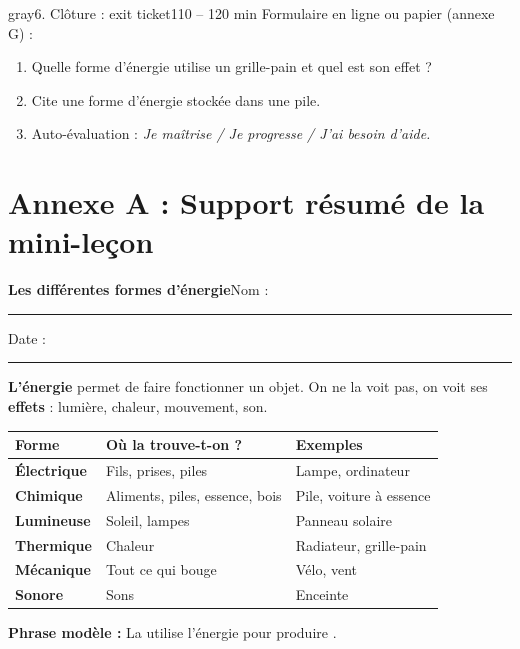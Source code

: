 \documentclass[11pt,a4paper]{article}
\newcommand{\entete}[2]{%
  \begin{tcolorbox}[colback=#1!10,colframe=#1!70!black,boxrule=0.8pt,arc=2mm]
  {\Large\bfseries #2}\hfill Nom : \rule{4cm}{0.3pt}\quad Date : \rule{2.2cm}{0.3pt}
  \end{tcolorbox}}
\begin{document}
\begin{etape}{gray}{6. Clôture : exit ticket}{110 -- 120 min}
Formulaire en ligne ou papier (annexe G) :
\begin{enumerate}
 \item Quelle forme d'énergie utilise un grille-pain et quel est son effet ?
 \item Cite une forme d'énergie stockée dans une pile.
 \item Auto-évaluation : \emph{Je maîtrise / Je progresse / J'ai besoin d'aide.}
\end{enumerate}
\end{etape}

\newpage
\section*{Annexe A : Support résumé de la mini-leçon}
\entete{blue}{Les différentes formes d'énergie}

\begin{tcolorbox}[colback=yellow!10,colframe=yellow!50!black]
\textbf{L'énergie} permet de faire fonctionner un objet. On ne la voit pas, on voit ses \textbf{effets} : lumière, chaleur, mouvement, son.
\end{tcolorbox}

\begin{tabularx}{\linewidth}{>{\bfseries}p{2.6cm}Y Y}
\toprule
Forme & Où la trouve-t-on ? & Exemples\\
\midrule
Électrique & Fils, prises, piles & Lampe, ordinateur\\
Chimique & Aliments, piles, essence, bois & Pile, voiture à essence\\
Lumineuse & Soleil, lampes & Panneau solaire\\
Thermique & Chaleur & Radiateur, grille-pain\\
Mécanique & Tout ce qui bouge & Vélo, vent\\
Sonore & Sons & Enceinte\\
\bottomrule
\end{tabularx}

\medskip
\begin{tcolorbox}[colback=green!8,colframe=green!50!black]
\textbf{Phrase modèle :} La \underline{\hspace{2.5cm}} utilise l'énergie \underline{\hspace{2.5cm}} pour produire \underline{\hspace{2.5cm}}.
\end{tcolorbox}
\end{document}
